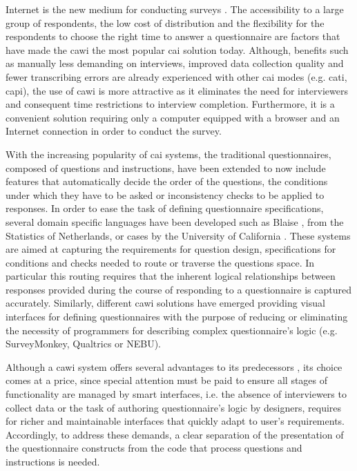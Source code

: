 	Internet is the new medium for conducting surveys \cite{book:bethlehem12}. The accessibility to a large group of respondents, the low cost of distribution and the flexibility for the respondents to choose the right time to answer a questionnaire are factors that have made the \gls{cawi} the most popular \gls{cai} solution today. Although, benefits such as manually less demanding on interviews, improved data collection quality and fewer transcribing errors are already experienced with other \gls{cai} modes (e.g. \gls{cati}, \gls{capi}), the use of \gls{cawi} is more attractive as it eliminates the need for interviewers and consequent time restrictions to interview completion. Furthermore, it is a convenient solution requiring only a computer equipped with a browser and an Internet connection in order to conduct the survey.

	With the increasing popularity of \gls{cai} systems, the traditional questionnaires, composed of questions and instructions, have been extended to now include features that automatically decide the order of the questions, the conditions under which they have to be asked or inconsistency checks to be applied to responses.
	In order to ease the task of defining questionnaire specifications, several domain specific languages have been developed such as Blaise \cite{web:blaise15}, from the Statistics of Netherlands, or \gls{cases} by the University of California \cite{web:cases15}. These systems are aimed at capturing the requirements for question design, specifications for conditions and checks needed to route or traverse the questions space. In particular this routing requires that the inherent logical relationships between responses provided during the course of responding to a questionnaire is captured accurately. %
	Similarly, different \gls{cawi} solutions have emerged providing visual interfaces for defining questionnaires with the purpose of reducing or eliminating the necessity of programmers for describing complex questionnaire's logic (e.g. SurveyMonkey, Qualtrics or NEBU).

	Although a \gls{cawi} system offers several advantages to its predecessors \cite{book:bethlehem12}, its choice comes at a price, since special attention must be paid to ensure all stages of functionality are managed by smart interfaces, i.e. the absence of interviewers to collect data or the task of authoring questionnaire's logic by designers, requires for richer and maintainable interfaces that quickly adapt to user's requirements. Accordingly, to address these demands, a clear separation of the presentation of the questionnaire constructs from the code that process questions and instructions is needed. %


